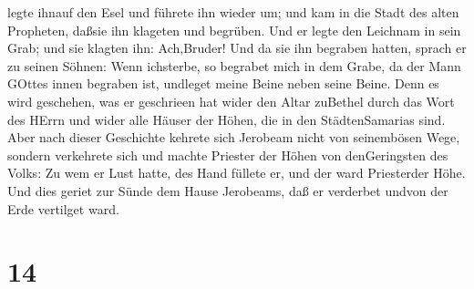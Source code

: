 legte ihnauf den Esel und führete ihn wieder um; und kam in die Stadt
des alten Propheten, daßsie ihn klageten und begrüben.  Und
er legte den Leichnam in sein Grab; und sie klagten ihn: Ach,Bruder!
 Und da sie ihn begraben hatten, sprach er zu seinen
Söhnen: Wenn ichsterbe, so begrabet mich in dem Grabe, da der Mann
GOttes innen begraben ist, undleget meine Beine neben seine Beine.
 Denn es wird geschehen, was er geschrieen hat wider den
Altar zuBethel durch das Wort des HErrn und wider alle Häuser der Höhen,
die in den StädtenSamarias sind.  Aber nach dieser
Geschichte kehrete sich Jerobeam nicht von seinembösen Wege, sondern
verkehrete sich und machte Priester der Höhen von denGeringsten des
Volks: Zu wem er Lust hatte, des Hand füllete er, und der ward
Priesterder Höhe.  Und dies geriet zur Sünde dem Hause
Jerobeams, daß er verderbet undvon der Erde vertilget ward.

\hypertarget{section-13}{%
\section{14}\label{section-13}}

